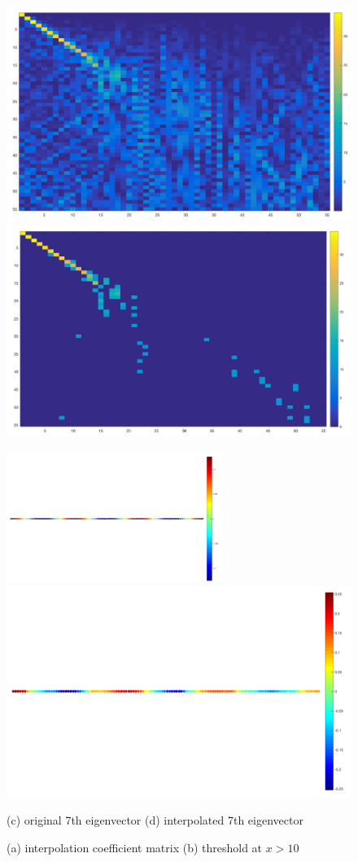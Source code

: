 \documentclass[a4paper]{article}
\begin{document}
\begin{figure}[H]
\centering
\includegraphics[width = 7 cm]{0629/coefficients_path_graph_4_stages}
\includegraphics[width = 7 cm]{0629/coefficients_path_graph_4_stages_threshold}

\includegraphics[width = 7cm]{0629/path_graph_4_stages_7th_eigenvec}
\includegraphics[width = 7 cm]{0629/path_graph_4_stages_7th_eigenvec_interpolated}
\caption{ (a) interpolation coefficient matrix (b) threshold at $x>10$ }
{(c) original 7th eigenvector (d) interpolated 7th eigenvector}
\end{figure}
\end{document}
